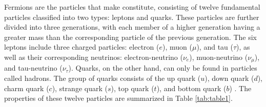 Fermions are the particles that make constitute, consisting of twelve fundamental particles classified into two types: leptons and quarks. These particles are further divided into three generations, with each member of a higher generation having a greater mass than the corresponding particle of the previous generation. The six leptons include three charged particles: electron ($e$), muon ($\mu$), and tau ($\tau$), as well as their corresponding neutrinos: electron-neutrino ($\nu_{e}$), muon-neutrino ($\nu_{\mu}$), and tau-neutrino ($\nu_{\tau}$). Quarks, on the other hand, can only be found in particles called hadrons. The group of quarks consists of the up quark ($u$), down quark ($d$), charm quark ($c$), strange quark ($s$), top quark ($t$), and bottom quark ($b$) \cite{griff}. The properties of these twelve particles are summarized in Table \ref{tab:table1}.

